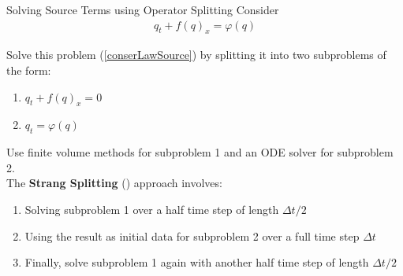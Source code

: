 \begin{frame}{Solving Source Terms using Operator Splitting}
	\scriptsize
	Consider
	\begin{align}
		q_t + f(q)_x = \varphi(q) \label{conserLawSource}
	\end{align}
	
	Solve this problem (\ref{conserLawSource}) by splitting it into two subproblems of the form:
  \begin{enumerate}
  	\item $q_t + f(q)_x = 0$
  	\item $q_t = \varphi(q)$
  \end{enumerate}
  \vspace{2mm}
   Use finite volume methods for subproblem 1 and an ODE solver for subproblem 2.\\
  \vspace{4mm}
  \pause
  The \textbf{Strang Splitting} (\cite{zbMATH00994008}) approach involves:
  \begin{enumerate}
  	\item Solving subproblem 1 over a half time step of length $\Delta t/2$
  	\item Using the result as initial data for subproblem 2 over a full time step $\Delta t$
  	\item Finally, solve subproblem 1 again with another half time step of length $\Delta t/2$
  \end{enumerate}
\end{frame}